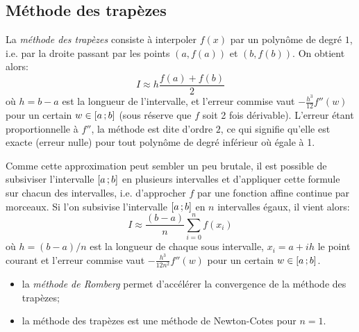 \subsection{Méthode des trapèzes} 
La \emph{méthode des trapèzes} consiste à interpoler $f(x)$ par un polynôme de degré $1$, i.e. par la droite passant par les points $(a,f(a))$ et $(b,f(b))$. On obtient alors: 
\begin{equation}
 I\approx h\dfrac{f(a)+f(b)}2
\end{equation}
où $h=b-a$ est la longueur de l'intervalle, et l'erreur commise vaut $-\frac{h^3}{12} f''(w)$ pour un certain $w\in\mathopen{[}a\,;b\mathclose{]}$ (sous réserve que $f$ soit 2 fois dérivable). L'erreur étant proportionnelle à $f''$, la méthode est dite d'ordre $2$, ce qui signifie qu'elle est exacte (erreur nulle) pour tout polynôme de degré inférieur où égale à 1. 

Comme cette approximation peut sembler un peu brutale, il est possible de subsiviser l'intervalle $\mathopen{[}a\,;b\mathclose{]}$ en plusieurs intervalles et d'appliquer cette formule sur chacun des intervalles, i.e. d'approcher $f$ par une fonction affine continue par morceaux. Si l'on subsivise l'intervalle $\mathopen{[}a\,;b\mathclose{]}$ en $n$ intervalles égaux, il vient alors: 
\begin{equation}
I\approx \frac{(b-a)}{n}\sum_{i=0}^{n}f(x_i)
\end{equation}
où $h=(b-a)/n$ est la longueur de chaque sous intervalle, $x_i=a+ih$ le point courant et l'erreur commise vaut $-\frac{h^3}{12n^2} f''(w)$ pour un certain $w\in\mathopen{[}a\,;b\mathclose{]}$. 
\begin{remarque}[Remarques]\mbox{}
\begin{itemize}
\item la \emph{méthode de Romberg} permet d'accélérer la convergence de la méthode des trapèzes;
\item la méthode des trapèzes est une méthode de Newton-Cotes pour $n=1$. 
\end{itemize}
\end{remarque} 
